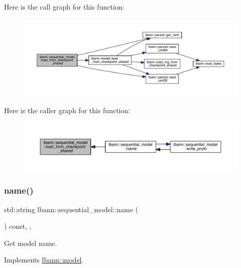 Here is the call graph for this function\+:\nopagebreak
\begin{figure}[H]
\begin{center}
\leavevmode
\includegraphics[width=350pt]{classlbann_1_1sequential__model_aa52cca299012c67f88483206d50abb21_cgraph}
\end{center}
\end{figure}
Here is the caller graph for this function\+:\nopagebreak
\begin{figure}[H]
\begin{center}
\leavevmode
\includegraphics[width=350pt]{classlbann_1_1sequential__model_aa52cca299012c67f88483206d50abb21_icgraph}
\end{center}
\end{figure}
\mbox{\label{classlbann_1_1sequential__model_abf2b69dacb5ee3165289377e1d961cd5}} 
\subsubsection{\texorpdfstring{name()}{name()}}
{\footnotesize\ttfamily std\+::string lbann\+::sequential\+\_\+model\+::name (\begin{DoxyParamCaption}{ }\end{DoxyParamCaption}) const\hspace{0.3cm}{\ttfamily [inline]}, {\ttfamily [override]}, {\ttfamily [virtual]}}

Get model name. 

Implements \hyperlink{classlbann_1_1model_a7e471599eded909c4ce7178689dd13b6}{lbann\+::model}.



